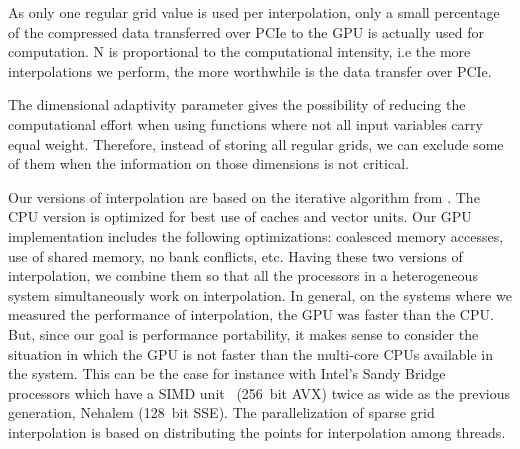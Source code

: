 As only one regular grid value is used per interpolation, only a small
percentage of the compressed data transferred over PCIe to the GPU is actually
used for computation. N is proportional to the computational intensity, i.e the
more interpolations we perform, the more worthwhile is the data transfer over
PCIe.

The dimensional adaptivity parameter gives the possibility of reducing the
computational effort when using functions where not all input variables carry
equal weight. Therefore, instead of storing all regular grids, we can exclude
some of them when the information on those dimensions is not critical.


Our versions of interpolation are based on the iterative algorithm from \cite{murarasu2011}. 
The CPU version is optimized for best use of caches and vector units. Our GPU
implementation includes the following optimizations: coalesced memory accesses,
use of shared memory, no bank conflicts, etc. Having these two versions of
interpolation, we combine them so that all the processors in a heterogeneous
system simultaneously work on interpolation. In general, on the systems where
we measured the performance of interpolation, the GPU was faster than the CPU.
But, since our goal is performance portability, it makes sense to consider the
situation in which the GPU is not faster than the multi-core CPUs available in
the system. This can be the case for instance with Intel's Sandy Bridge
processors which have a SIMD unit~\cite{avx} (256~bit AVX) twice as wide as the
previous generation, Nehalem (128~bit SSE). The parallelization of sparse grid
interpolation is based on distributing the points for interpolation among
threads.
